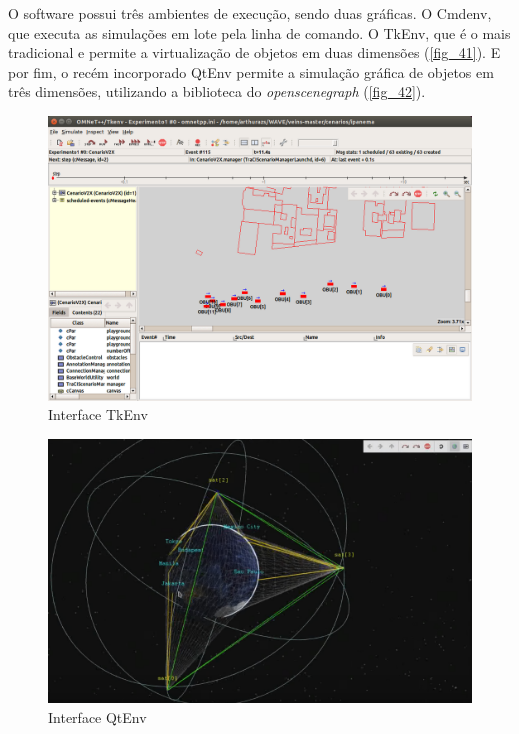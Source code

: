 \documentclass[
12pt,				%
openright,			%
oneside,			%
a4paper,			%
brazil,				%
]{abntex2}
\begin{document}
	\par O software possui três ambientes de execução, sendo duas gráficas. O Cmdenv, que executa as simulações em lote pela linha de comando. O TkEnv, que é o mais tradicional e permite a virtualização de objetos em duas dimensões (\autoref{fig_41}). E por fim, o recém incorporado QtEnv permite a simulação gráfica de objetos em três dimensões, utilizando a biblioteca do \textit{openscenegraph} (\autoref{fig_42}).
	
	\begin{figure} [H]
		\centering
		\includegraphics[scale=.4]{figuras/cap4/41InterfaceTKENV}
		\caption{\label{fig_41}Interface TkEnv}
	\end{figure}
	
	\begin{figure} [H]
		\centering
		\includegraphics[scale=.4]{figuras/cap4/42InterfaceQTENV}
		\caption{\label{fig_42}Interface QtEnv}
	\end{figure}
		
\end{document}
